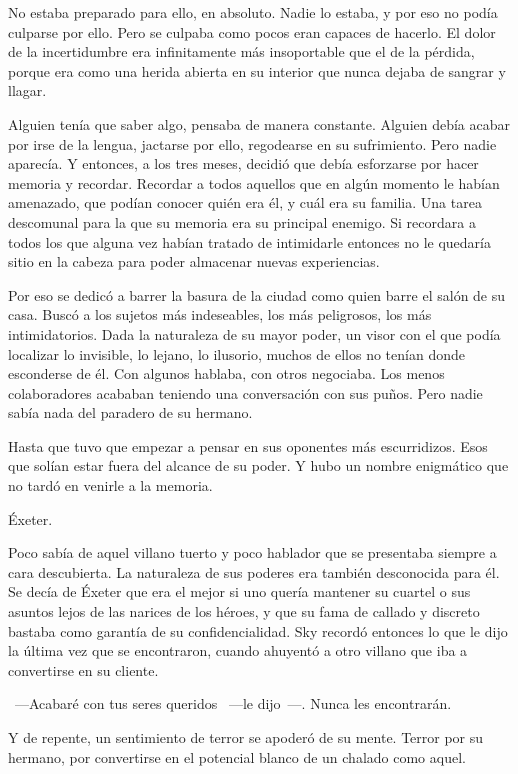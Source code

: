 No estaba preparado para ello, en absoluto. Nadie lo estaba, y por eso no podía culparse por ello. Pero se culpaba como pocos eran capaces de hacerlo. El dolor de la incertidumbre era infinitamente más insoportable que el de la pérdida, porque era como una herida abierta en su interior que nunca dejaba de sangrar y llagar.

Alguien tenía que saber algo, pensaba de manera constante. Alguien debía acabar por irse de la lengua, jactarse por ello, regodearse en su sufrimiento. Pero nadie aparecía. Y entonces, a los tres meses, decidió que debía esforzarse por hacer memoria y recordar. Recordar a todos aquellos que en algún momento le habían amenazado, que podían conocer quién era él, y cuál era su familia. Una tarea descomunal para la que su memoria era su principal enemigo. Si recordara a todos los que alguna vez habían tratado de intimidarle entonces no le quedaría sitio en la cabeza para poder almacenar nuevas experiencias.

Por eso se dedicó a barrer la basura de la ciudad como quien barre el salón de su casa. Buscó a los sujetos más indeseables, los más peligrosos, los más intimidatorios. Dada la naturaleza de su mayor poder, un visor con el que podía localizar lo invisible, lo lejano, lo ilusorio, muchos de ellos no tenían donde esconderse de él. Con algunos hablaba, con otros negociaba. Los menos colaboradores acababan teniendo una conversación con sus puños. Pero nadie sabía nada del paradero de su hermano.

Hasta que tuvo que empezar a pensar en sus oponentes más escurridizos. Esos que solían estar fuera del alcance de su poder. Y hubo un nombre enigmático que no tardó en venirle a la memoria.

Éxeter.

Poco sabía de aquel villano tuerto y poco hablador que se presentaba siempre a cara descubierta. La naturaleza de sus poderes era también desconocida para él. Se decía de Éxeter que era el mejor si uno quería mantener su cuartel o sus asuntos lejos de las narices de los héroes, y que su fama de callado y discreto bastaba como garantía de su confidencialidad. Sky recordó entonces lo que le dijo la última vez que se encontraron, cuando ahuyentó a otro villano que iba a convertirse en su cliente.

~---Acabaré con tus seres queridos ~---le dijo~---. Nunca les encontrarán.

Y de repente, un sentimiento de terror se apoderó de su mente. Terror por su hermano, por convertirse en el potencial blanco de un chalado como aquel.

